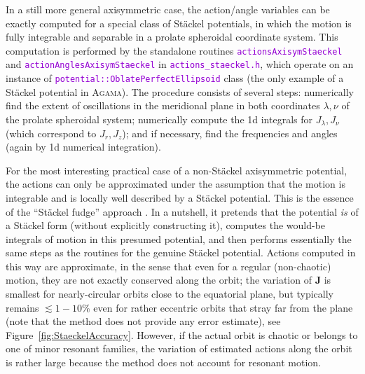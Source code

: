\documentclass[12pt]{article}
\newcommand{\Agama}{\textsc{Agama}\xspace}
\newcommand{\ttt}[1]{\textcolor{darkviolet}{\texttt{#1}}}
\newcommand{\bJ}{\boldsymbol{J}}
\begin{document}
In a still more general axisymmetric case, the action/angle variables can be exactly computed for a special class of St\"ackel potentials, in which the motion is fully integrable and separable in a prolate spheroidal coordinate system. This computation is performed by the standalone routines \ttt{actionsAxisymStaeckel} and \ttt{actionAnglesAxisymStaeckel} in \ttt{actions_staeckel.h}, which operate on an instance of \ttt{potential::OblatePerfectEllipsoid} class (the only example of a St\"ackel potential in \Agama). The procedure consists of several steps: numerically find the extent of oscillations in the meridional plane in both coordinates $\lambda, \nu$ of the prolate spheroidal system; numerically compute the 1d integrals for $J_\lambda, J_\nu$ (which correspond to $J_r, J_z$); and if necessary, find the frequencies and angles (again by 1d numerical integration).

For the most interesting practical case of a non-St\"ackel axisymmetric potential, the actions can only be approximated under the assumption that the motion is integrable and is locally well described by a St\"ackel potential. This is the essence of the ``St\"ackel fudge'' approach \cite{Binney2012}. In a nutshell, it pretends that the potential \textit{is} of a St\"ackel form (without explicitly constructing it), computes the would-be integrals of motion in this presumed potential, and then performs essentially the same steps as the routines for the genuine St\"ackel potential. Actions computed in this way are approximate, in the sense that even for a regular (non-chaotic) motion, they are not exactly conserved along the orbit; the variation of $\bJ$ is smallest for nearly-circular orbits close to the equatorial plane, but typically remains $\lesssim 1-10\%$ even for rather eccentric orbits that stray far from the plane (note that the method does not provide any error estimate), see Figure~\ref{fig:StaeckelAccuracy}. However, if the actual orbit is chaotic or belongs to one of minor resonant families, the variation of estimated actions along the orbit is rather large because the method does not account for resonant motion.
\end{document}
